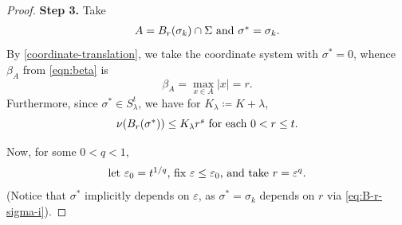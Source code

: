 \documentclass[preprint, reqno]{amsart}
\renewcommand{\epsilon}{\varepsilon}
\theoremstyle{definition}
\numberwithin{equation}{section}
\begin{document}
\begin{proof}
  \medskip

  \textbf{Step 3.}
  Take
  \begin{align*}
    \hbox{$A = B_r(\sigma_k)\cap \Sigma$ and  $\sigma^* = \sigma_k.$}
  \end{align*}
  By \eqref{coordinate-translation}, we take the coordinate system
  with $\sigma^*=0$, whence $\beta_A$ from \eqref{eqn:beta} is
  \[
    \beta_A = \max_{x \in A} \lvert x \rvert = r.
  \]
  Furthermore, since $\sigma^* \in S_\lambda^t$, we have for
  $K_\lambda \coloneqq K+\lambda$,
  \begin{equation}
    \hbox{$\nu(B_r(\sigma^*)) \leq K_{\lambda}r^s$ for each $0 < r\le
      t$.} \label{eq:nu-B-r-K-rs}
  \end{equation}

  Now, for some $0 < q < 1$,
  \begin{align*}
    \hbox{let $\epsilon_0=t^{1/q}$, fix $\epsilon \le \epsilon_0$, and
    take $r = \epsilon^q$.}
  \end{align*}
  (Notice that $\sigma^*$ implicitly depends on $\epsilon$, as
  $\sigma^* = \sigma_k$ depends on $r$ via \eqref{eq:B-r-sigma-i}).




\end{proof}
\end{document}

